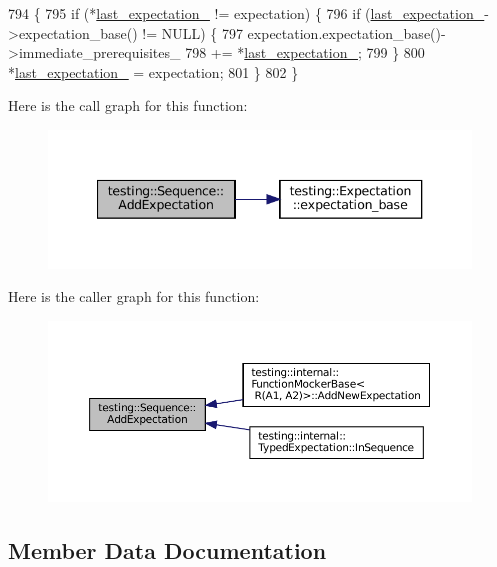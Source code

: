 \begin{DoxyCode}
794                                                                   \{
795   \textcolor{keywordflow}{if} (*\hyperlink{classtesting_1_1Sequence_a255551ecc8157f7f88cf6f58eb327419}{last\_expectation\_} != expectation) \{
796     \textcolor{keywordflow}{if} (\hyperlink{classtesting_1_1Sequence_a255551ecc8157f7f88cf6f58eb327419}{last\_expectation\_}->expectation\_base() != NULL) \{
797       expectation.expectation\_base()->immediate\_prerequisites\_
798           += *\hyperlink{classtesting_1_1Sequence_a255551ecc8157f7f88cf6f58eb327419}{last\_expectation\_};
799     \}
800     *\hyperlink{classtesting_1_1Sequence_a255551ecc8157f7f88cf6f58eb327419}{last\_expectation\_} = expectation;
801   \}
802 \}
\end{DoxyCode}
Here is the call graph for this function\+:
\nopagebreak
\begin{figure}[H]
\begin{center}
\leavevmode
\includegraphics[width=340pt]{classtesting_1_1Sequence_ac5b77b3b5b2e229ccbc13be1f3d17a9c_cgraph}
\end{center}
\end{figure}
Here is the caller graph for this function\+:
\nopagebreak
\begin{figure}[H]
\begin{center}
\leavevmode
\includegraphics[width=350pt]{classtesting_1_1Sequence_ac5b77b3b5b2e229ccbc13be1f3d17a9c_icgraph}
\end{center}
\end{figure}


\subsection{Member Data Documentation}
\mbox{\label{classtesting_1_1Sequence_a255551ecc8157f7f88cf6f58eb327419}} 
